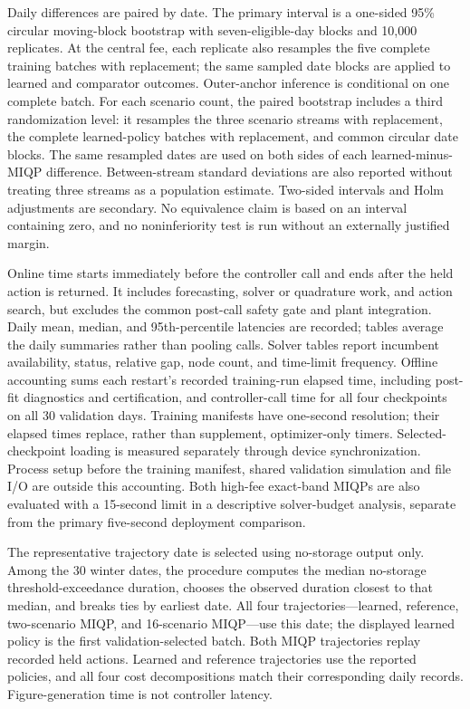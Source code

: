 \documentclass[preprint,11pt]{elsarticle}
\begin{document}
Daily differences are paired by date. The primary interval is a one-sided
95\% circular moving-block bootstrap \citep{PolitisRomano1992} with
seven-eligible-day blocks and 10,000 replicates. At the central fee, each
replicate also resamples the five complete
training batches with replacement; the same sampled date blocks are applied to
learned and comparator outcomes. Outer-anchor inference is conditional on one
complete batch.
For each scenario count, the paired bootstrap includes a third
randomization level: it resamples the three scenario streams with replacement,
the complete learned-policy batches with replacement, and common circular
date blocks. The same resampled dates are used on both sides of each
learned-minus-MIQP difference. Between-stream standard deviations are also
reported without treating three streams as a population estimate.
Two-sided intervals and Holm adjustments \citep{Holm1979} are secondary. No equivalence claim
is based on an interval containing zero, and no noninferiority test is run
without an externally justified margin.

Online time starts immediately before the controller call and ends after the
held action is returned. It includes forecasting, solver or quadrature work,
and action search, but excludes the common post-call safety gate and plant
integration. Daily mean, median, and 95th-percentile latencies are recorded;
tables average the daily summaries rather than pooling calls. Solver tables report incumbent
availability, status, relative gap, node count, and time-limit frequency.
Offline accounting sums each restart's recorded training-run elapsed time,
including post-fit diagnostics and certification, and controller-call time for
all four checkpoints on all 30 validation days. Training manifests have
one-second resolution; their elapsed times replace, rather than supplement,
optimizer-only timers. Selected-checkpoint loading is measured separately
through device synchronization. Process setup before the training manifest,
shared validation simulation and file I/O are outside this accounting. Both
high-fee exact-band MIQPs are also evaluated with a 15-second limit in a
descriptive solver-budget analysis, separate from the primary five-second
deployment comparison.

The representative trajectory date is selected using no-storage output only.
Among the 30 winter dates, the procedure computes the median no-storage
threshold-exceedance duration, chooses the observed duration closest to that
median, and breaks ties by earliest date. All four trajectories---learned,
reference, two-scenario MIQP, and 16-scenario MIQP---use this date; the displayed
learned policy is the first validation-selected batch. Both MIQP trajectories
replay recorded held actions. Learned and reference trajectories use the
reported policies, and all four cost decompositions match their corresponding
daily records. Figure-generation time is not controller latency.
\end{document}
